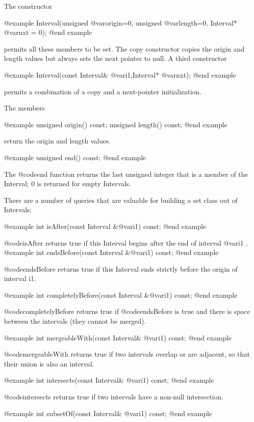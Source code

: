 The constructor

@example
Interval(unsigned @var{origin}=0, unsigned @var{length}=0,
    Interval* @var{nxt} = 0);
@end example

permits all these members to be set.  The copy constructor copies
the origin and length values but always sets the next pointer to null.
A third constructor

@example
Interval(const Interval& @var{i1},Interval* @var{nxt});
@end example

permits a combination of a copy and a next-pointer initialization.

The members

@example
unsigned origin() const;
unsigned length() const;
@end example

return the origin and length values.

@example
unsigned end() const;
@end example

The @code{end} function returns the last unsigned integer that is a
member of the Interval; 0 is returned for empty Intervals.

There are a number of queries that are valuable for building a set
class out of Intervals:

@example
int isAfter(const Interval &@var{i1}) const;
@end example

@code{isAfter} returns true if this Interval begins after the end of
interval @var{i1}
.
@example
int endsBefore(const Interval &@var{i1}) const;
@end example

@code{endsBefore} returns true if this Interval ends strictly before
the origin of interval i1.

@example
int completelyBefore(const Interval &@var{i1}) const;
@end example

@code{completelyBefore} returns true if @code{endsBefore} is true and there
is space between the intervals (they cannot be merged).

@example
int mergeableWith(const Interval& @var{i1}) const;
@end example

@code{mergeableWith} returns true if two intervals overlap or are
adjacent, so that their union is also an interval.

@example
int intersects(const Interval& @var{i1}) const;
@end example

@code{intersects} returns true if two intervals have a non-null
intersection.

@example
int subsetOf(const Interval& @var{i1}) const;
@end example

